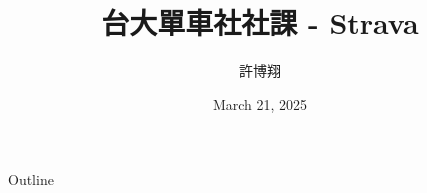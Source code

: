 \title{台大單車社社課 - Strava}
\author{許博翔}
\institute{}
\date{March 21, 2025}


\frame{\titlepage}
\begin{frame}{Outline}
\tableofcontents
\end{frame}








